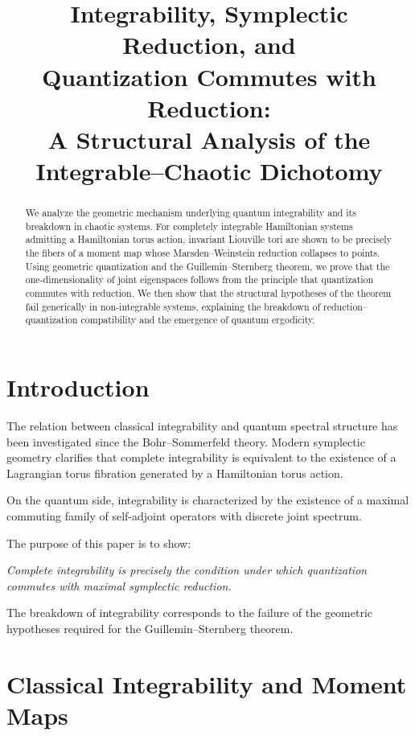 \documentclass[11pt]{article}
\title{\textbf{Integrability, Symplectic Reduction, and\\
Quantization Commutes with Reduction:\\
A Structural Analysis of the Integrable--Chaotic Dichotomy}}
\author{}
\date{}
\begin{document}
\maketitle

\begin{abstract}
We analyze the geometric mechanism underlying quantum integrability and its breakdown in chaotic systems. 
For completely integrable Hamiltonian systems admitting a Hamiltonian torus action, invariant Liouville tori are shown to be precisely the fibers of a moment map whose Marsden--Weinstein reduction collapses to points. 
Using geometric quantization and the Guillemin--Sternberg theorem, we prove that the one-dimensionality of joint eigenspaces follows from the principle that quantization commutes with reduction. 
We then show that the structural hypotheses of the theorem fail generically in non-integrable systems, explaining the breakdown of reduction--quantization compatibility and the emergence of quantum ergodicity.
\end{abstract}

\tableofcontents

\section{Introduction}

The relation between classical integrability and quantum spectral structure has been investigated since the Bohr--Sommerfeld theory. 
Modern symplectic geometry clarifies that complete integrability is equivalent to the existence of a Lagrangian torus fibration generated by a Hamiltonian torus action. 

On the quantum side, integrability is characterized by the existence of a maximal commuting family of self-adjoint operators with discrete joint spectrum. 

The purpose of this paper is to show:

\begin{center}
\emph{Complete integrability is precisely the condition under which quantization commutes with maximal symplectic reduction.}
\end{center}

The breakdown of integrability corresponds to the failure of the geometric hypotheses required for the Guillemin--Sternberg theorem.

\section{Classical Integrability and Moment Maps}
\end{document}
